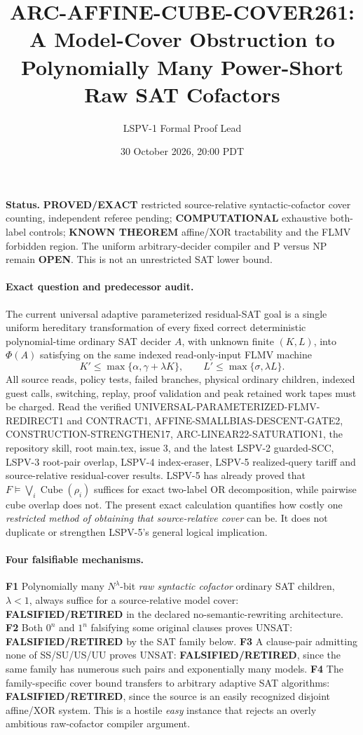\documentclass[11pt]{article}
\title{ARC-AFFINE-CUBE-COVER261: A Model-Cover Obstruction to Polynomially Many Power-Short Raw SAT Cofactors}
\author{LSPV-1 Formal Proof Lead}
\date{30 October 2026, 20:00 PDT}
\begin{document}
\maketitle
\noindent\textbf{Status.} \textbf{PROVED/EXACT} restricted source-relative syntactic-cofactor cover counting, independent referee pending; \textbf{COMPUTATIONAL} exhaustive both-label controls; \textbf{KNOWN THEOREM} affine/XOR tractability and the FLMV forbidden region. The uniform arbitrary-decider compiler and P versus NP remain \textbf{OPEN}. This is not an unrestricted SAT lower bound.

\paragraph{Exact question and predecessor audit.}
The current universal adaptive parameterized residual-SAT goal is a single uniform hereditary transformation of every fixed correct deterministic polynomial-time ordinary SAT decider $A$, with unknown finite $(K,L)$, into $\Phi(A)$ satisfying on the same indexed read-only-input FLMV machine
\[
K'\le\max\{\alpha,\gamma+\lambda K\},\qquad
L'\le\max\{\sigma,\lambda L\}.
\]
All source reads, policy tests, failed branches, physical ordinary children, indexed guest calls, switching, replay, proof validation and peak retained work tapes must be charged. Read the verified UNIVERSAL-PARAMETERIZED-FLMV-REDIRECT1 and CONTRACT1, AFFINE-SMALLBIAS-DESCENT-GATE2, CONSTRUCTION-STRENGTHEN17, ARC-LINEAR22-SATURATION1, the repository skill, root main.tex, issue 3, and the latest LSPV-2 guarded-SCC, LSPV-3 root-pair overlap, LSPV-4 index-eraser, LSPV-5 realized-query tariff and source-relative residual-cover results. LSPV-5 has already proved that $F\models\bigvee_i\operatorname{Cube}(\rho_i)$ suffices for exact two-label OR decomposition, while pairwise cube overlap does not. The present exact calculation quantifies how costly one \emph{restricted method of obtaining that source-relative cover} can be. It does not duplicate or strengthen LSPV-5's general logical implication.

\paragraph{Four falsifiable mechanisms.}
\textbf{F1} Polynomially many $N^\lambda$-bit \emph{raw syntactic cofactor} ordinary SAT children, $\lambda<1$, always suffice for a source-relative model cover: \textbf{FALSIFIED/RETIRED} in the declared no-semantic-rewriting architecture. \textbf{F2} Both $0^n$ and $1^n$ falsifying some original clauses proves UNSAT: \textbf{FALSIFIED/RETIRED} by the SAT family below. \textbf{F3} A clause-pair admitting none of SS/SU/US/UU proves UNSAT: \textbf{FALSIFIED/RETIRED}, since the same family has numerous such pairs and exponentially many models. \textbf{F4} The family-specific cover bound transfers to arbitrary adaptive SAT algorithms: \textbf{FALSIFIED/RETIRED}, since the source is an easily recognized disjoint affine/XOR system. This is a hostile \emph{easy} instance that rejects an overly ambitious raw-cofactor compiler argument.
\end{document}
